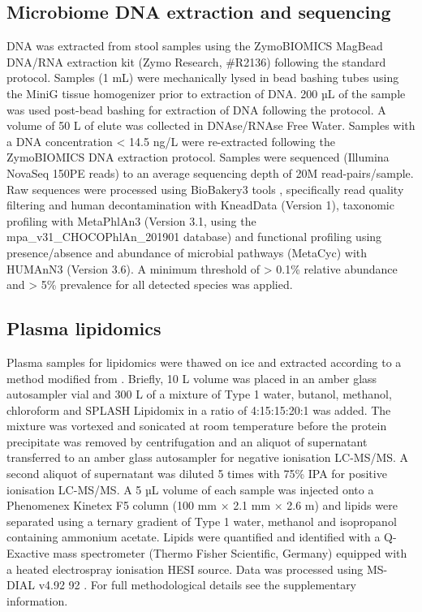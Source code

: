 \documentclass{article}
\begin{document}
\subsection*{Microbiome DNA extraction and sequencing}
DNA was extracted from stool samples using the ZymoBIOMICS MagBead DNA/RNA extraction kit (Zymo Research, \#R2136) following the standard protocol.
Samples (1 mL) were mechanically lysed in bead bashing tubes using the MiniG tissue homogenizer prior to extraction of DNA.
200 µL of the sample was used post-bead bashing for extraction of DNA following the protocol.
A volume of 50 \textmu{} L of elute was collected in DNAse/RNAse Free Water.
Samples with a DNA concentration \textless{} 14.5 ng/\textmu{}L were re-extracted following the ZymoBIOMICS DNA extraction protocol.
Samples were sequenced (Illumina NovaSeq 150PE reads) to an average sequencing depth of 20M read-pairs/sample.
Raw sequences were processed using BioBakery3 tools \cite{beghini2021integrating}, specifically read quality filtering and human decontamination with KneadData (Version 1), taxonomic profiling with MetaPhlAn3 (Version 3.1, using the mpa\_v31\_CHOCOPhlAn\_201901 database) and functional profiling using presence/absence and abundance of microbial pathways (MetaCyc) with HUMAnN3 (Version 3.6).
A minimum threshold of \textgreater{} 0.1\% relative abundance and \textgreater{} 5\% prevalence for all detected species was applied. 

\subsection*{Plasma lipidomics}
Plasma samples for lipidomics were thawed on ice and extracted according to a method modified from \citet{liu2016plasma}.
Briefly, 10 \textmu{}L volume was placed in an amber glass autosampler vial and 300 \textmu{}L of a mixture of Type 1 water, butanol, methanol, chloroform and SPLASH Lipidomix in a ratio of 4:15:15:20:1 was added.
The mixture was vortexed and sonicated at room temperature before the protein precipitate was removed by centrifugation and an aliquot of supernatant transferred to an amber glass autosampler for negative ionisation LC-MS/MS.
A second aliquot of supernatant was diluted 5 times with 75\% IPA for positive ionisation LC-MS/MS.
A 5 µL volume of each sample was injected onto a Phenomenex Kinetex F5 column (100 mm × 2.1 mm × 2.6 \textmu{}m) and lipids were separated using a ternary gradient of Type 1 water, methanol and isopropanol containing ammonium acetate.
Lipids were quantified and identified with a Q-Exactive mass spectrometer (Thermo Fisher Scientific, Germany) equipped with a heated electrospray ionisation HESI source.
Data was processed using MS-DIAL v4.92 92 \cite{tsugawa2015ms}.
For full methodological details see the supplementary information.
\end{document}
